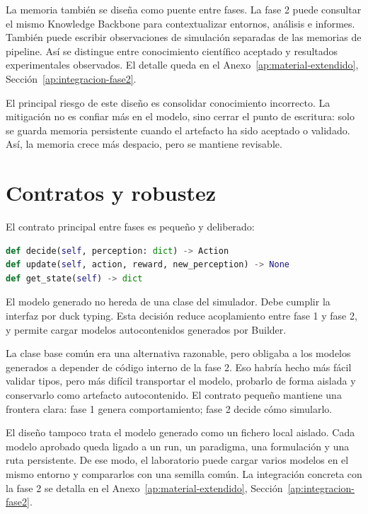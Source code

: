 La memoria también se diseña como puente entre fases. La fase 2 puede consultar
el mismo Knowledge Backbone para contextualizar entornos, análisis e informes.
También puede escribir observaciones de simulación separadas de las memorias de
pipeline. Así se distingue entre conocimiento científico aceptado y resultados
experimentales observados. El detalle queda en el
Anexo~\ref{ap:material-extendido}, Sección~\ref{ap:integracion-fase2}.

El principal riesgo de este diseño es consolidar conocimiento incorrecto. La
mitigación no es confiar más en el modelo, sino cerrar el punto de escritura:
solo se guarda memoria persistente cuando el artefacto ha sido aceptado o
validado. Así, la memoria crece más despacio, pero se mantiene revisable.

\section{Contratos y robustez}

El contrato principal entre fases es pequeño y deliberado:

\begin{lstlisting}[language=Python]
def decide(self, perception: dict) -> Action
def update(self, action, reward, new_perception) -> None
def get_state(self) -> dict
\end{lstlisting}

El modelo generado no hereda de una clase del simulador. Debe cumplir la
interfaz por duck typing. Esta decisión reduce acoplamiento entre fase 1 y fase
2, y permite cargar modelos autocontenidos generados por Builder.

La clase base común era una alternativa razonable, pero obligaba a los modelos
generados a depender de código interno de la fase 2. Eso habría hecho más fácil
validar tipos, pero más difícil transportar el modelo, probarlo de forma aislada
y conservarlo como artefacto autocontenido. El contrato pequeño mantiene una
frontera clara: fase 1 genera comportamiento; fase 2 decide cómo simularlo.

El diseño tampoco trata el modelo generado como un fichero local aislado. Cada
modelo aprobado queda ligado a un run, un paradigma, una formulación y una ruta
persistente. De ese modo, el laboratorio puede cargar varios modelos en el
mismo entorno y compararlos con una semilla común. La integración concreta con
la fase 2 se detalla en el Anexo~\ref{ap:material-extendido},
Sección~\ref{ap:integracion-fase2}.

